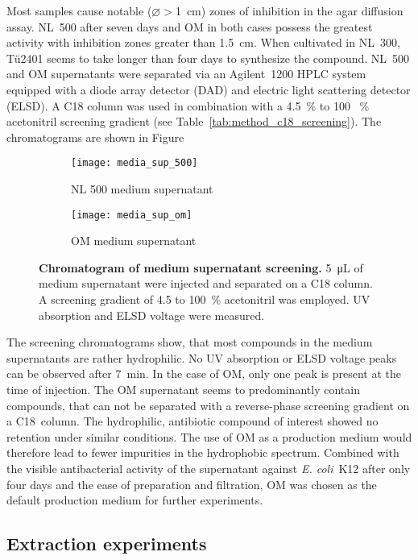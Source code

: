 	Most samples cause notable ($\varnothing>$\SI{1}{\centi\meter}) zones of inhibition in the agar diffusion assay.
	NL~500 after seven days and OM in both cases possess the greatest activity with inhibition zones greater than \SI{1.5}{\centi\meter}.
	When cultivated in NL~300, Tü2401 seems to take longer than four days to synthesize the compound.
	NL~500 and OM supernatants were separated via an Agilent~1200 HPLC system equipped with a diode array detector (DAD) and electric light scattering detector (ELSD).
	A C18 column was used in combination with a 4.5~\% to 100~ \% acetonitril screening gradient (see Table~\ref{tab:method_c18_screening}).
	The chromatograms are shown in Figure~
	
	\begin{figure}[htbp]
		\centering
		\begin{subfigure}{0.8\textwidth}
			\texttt{[image: media\_sup\_500]}
			\caption{NL 500 medium supernatant}
		\end{subfigure}
		\begin{subfigure}{0.8\textwidth}
			\texttt{[image: media\_sup\_om]}
			\caption{OM medium supernatant}
		\end{subfigure}
		\caption[Chromatogram of medium supernatant screening]{%
			\textbf{Chromatogram of medium supernatant screening.}
			\SI{5}{\micro\liter} of medium supernatant were injected and separated on a C18 column.
			A screening gradient of 4.5 to 100~\% acetonitril was employed.
			UV absorption and ELSD voltage were measured.}
		\label{fig:results_medium_screen}
	\end{figure}
	
	The screening chromatograms show, that most compounds in the medium supernatants are rather hydrophilic.
	No UV absorption or ELSD voltage peaks can be observed after \SI{7}{\minute}. In the case of OM, only one peak is present at the time of injection.
	The OM supernatant seems to predominantly contain compounds, that can not be separated with a reverse-phase screening gradient on a C18~column.
	The hydrophilic, antibiotic compound of interest showed no retention under similar conditions.
	The use of OM as a production medium would therefore lead to fewer impurities in the hydrophobic spectrum.
	Combined with the visible antibacterial activity of the supernatant against \textit{E. coli}~K12 after only four days and the ease of preparation and filtration, OM was chosen as the default production medium for further experiments.
	
	\subsection{Extraction experiments}
	\label{sub:extraction_experiments}
	
